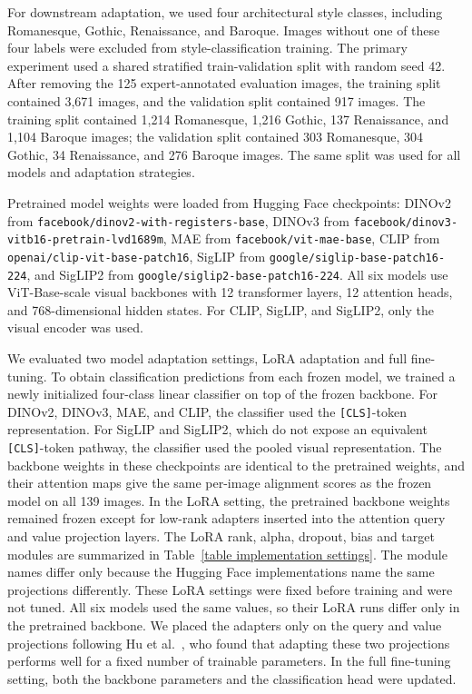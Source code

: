 \documentclass[lineno,pdflatex,sn-mathphys-num]{sn-jnl}%
\theoremstyle{thmstyleone}%
\theoremstyle{thmstyletwo}%
\theoremstyle{thmstylethree}%
\begin{document}
For downstream adaptation, we used four architectural style classes, including Romanesque, Gothic, Renaissance, and Baroque. Images without one of these four labels were excluded from style-classification training. The primary experiment used a shared stratified train-validation split with random seed 42. After removing the 125 expert-annotated evaluation images, the training split contained 3,671 images, and the validation split contained 917 images. The training split contained 1,214 Romanesque, 1,216 Gothic, 137 Renaissance, and 1,104 Baroque images; the validation split contained 303 Romanesque, 304 Gothic, 34 Renaissance, and 276 Baroque images. The same split was used for all models and adaptation strategies.

Pretrained model weights were loaded from Hugging Face checkpoints: DINOv2 from \texttt{facebook/dinov2-with-registers-base}, DINOv3 from \texttt{facebook/dinov3-vitb16-pretrain-lvd1689m}, MAE from \texttt{facebook/vit-mae-base}, CLIP from \texttt{openai/clip-vit-base-patch16}, SigLIP from \texttt{google/siglip-base-patch16-224}, and SigLIP2 from \texttt{google/siglip2-base-patch16-224}. All six models use ViT-Base-scale visual backbones with 12 transformer layers, 12 attention heads, and 768-dimensional hidden states. For CLIP, SigLIP, and SigLIP2, only the visual encoder was used.

We evaluated two model adaptation settings, LoRA adaptation and full fine-tuning. To obtain classification predictions from each frozen model, we trained a newly initialized four-class linear classifier on top of the frozen backbone. For DINOv2, DINOv3, MAE, and CLIP, the classifier used the \texttt{[CLS]}-token representation. For SigLIP and SigLIP2, which do not expose an equivalent \texttt{[CLS]}-token pathway, the classifier used the pooled visual representation. The backbone weights in these checkpoints are identical to the pretrained weights, and their attention maps give the same per-image alignment scores as the frozen model on all 139 images. In the LoRA setting, the pretrained backbone weights remained frozen except for low-rank adapters inserted into the attention query and value projection layers. The LoRA rank, alpha, dropout, bias and target modules are summarized in Table~\ref{table implementation settings}. The module names differ only because the Hugging Face implementations name the same projections differently. These LoRA settings were fixed before training and were not tuned. All six models used the same values, so their LoRA runs differ only in the pretrained backbone. We placed the adapters only on the query and value projections following Hu et al.~\cite{hu2022lora}, who found that adapting these two projections performs well for a fixed number of trainable parameters. In the full fine-tuning setting, both the backbone parameters and the classification head were updated.
\end{document}
